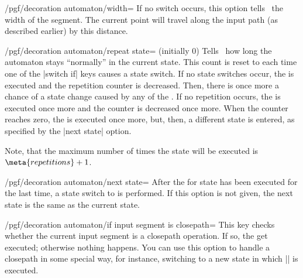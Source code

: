 \begin{command}{\pgfdeclaredecoration{}}
\begin{command}{\state{}}
\begin{key}{/pgf/decoration automaton/width=}
      If no switch occurs, this option tells \pgfname\ the width of
      the segment. The current point will travel along the input path
      (as described earlier)   by this distance.
    \end{key}
    \begin{key}{/pgf/decoration automaton/repeat state= (initially 0)}
      Tells \pgfname\ how long the automaton stays ``normally'' in the
      current state. This count is reset to  each
      time one of the |switch if| keys causes a state switch. If no
      state switches occur, the  is executed and the
      repetition counter is decreased. Then, there is once more a
      chance of a state change caused by any of the . If
      no repetition occurs, the  is executed
      once more and the counter is decreased once more. When the
      counter reaches zero, the  is executed once more,
      but, then, a different state is entered, as specified by the
      |next state| option.

      Note, that the maximum number of times the state will be executed
      is $\meta{repetitions}+1$.
    \end{key}
    \begin{key}{/pgf/decoration automaton/next state=}
      After the  for state has been executed for the last
      time, a state switch to  is performed. If this
      option is not given, the next state is the same as the current state.
    \end{key}

    \begin{key}{/pgf/decoration automaton/if input segment is closepath=}
      This key checks whether the current input segment is a closepath
      operation. If so, the  get executed; otherwise
      nothing happens. You can use this option to handle a closepath
      in some special way, for instance, switching to a new state in
      which |\pgfpathclose| is executed.
    \end{key}


\end{command}
\end{command}
